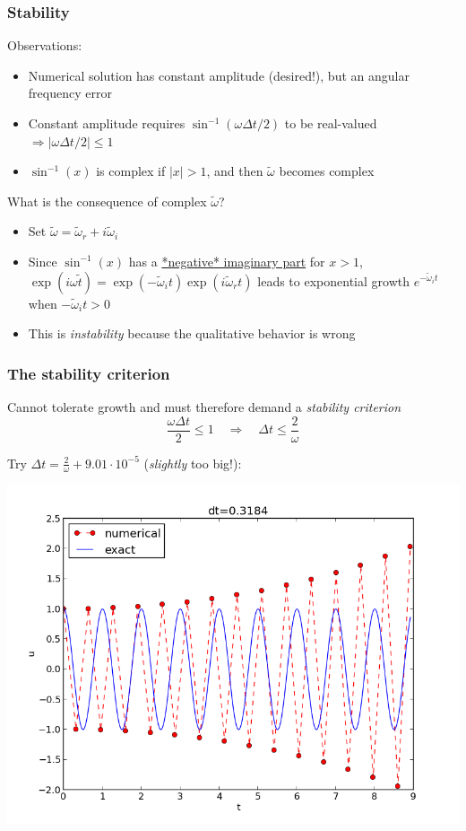 \documentclass{beamer}
\begin{document}
\begin{frame}
\frametitle{Stability}

Observations:

\begin{itemize}
 \item Numerical solution has constant amplitude (desired!), but an angular frequency error

 \item Constant amplitude requires $\sin^{-1}(\omega\Delta t/2)$ to be
   real-valued $\Rightarrow |\omega\Delta t/2| \leq 1$

 \item $\sin^{-1}(x)$ is complex if $|x| > 1$, and then $\tilde\omega$ becomes
   complex
\end{itemize}

\noindent
What is the consequence of complex $\tilde\omega$?

\begin{itemize}
 \item Set $\tilde\omega = \tilde\omega_r + i\tilde\omega_i$

 \item Since $\sin^{-1}(x)$ has a \href{{http://www.wolframalpha.com/input/?i=arcsin%28x%29%2C+x+in+%280%2C3%29}}{*negative* imaginary part} for
   $x>1$, $\exp{(i\omega\tilde t)}=\exp{(-\tilde\omega_i t)}\exp{(i\tilde\omega_r t)}$
   leads to exponential growth $e^{-\tilde\omega_it}$
   when $-\tilde\omega_i t > 0$

 \item This is \emph{instability} because the qualitative behavior is wrong
\end{itemize}

\noindent
\end{frame}

\begin{frame}
\frametitle{The stability criterion}


Cannot tolerate growth and must therefore demand a \emph{stability criterion}
\[
\frac{\omega\Delta t}{2} \leq 1\quad\Rightarrow\quad
\Delta t \leq \frac{2}{\omega}
\]

Try $\Delta t = \frac{2}{\omega} + 9.01\cdot 10^{-5}$ (\emph{slightly} too big!):



\centerline{\includegraphics[width=0.8\linewidth]{fig-vib/vib_unstable.png}}
\end{frame}
\end{document}
